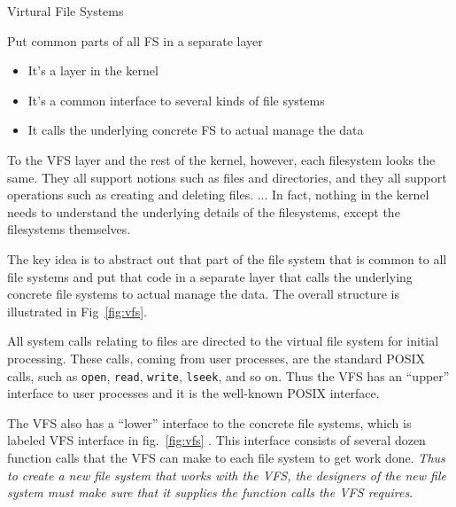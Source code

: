 \begin{frame}{Virtural File Systems}
  \begin{block}{Put common parts of all FS in a separate layer}
    \begin{itemize}
    \item It's a layer in the kernel
    \item It's a common interface to several kinds of file systems
    \item It calls the underlying concrete FS to actual manage the data
    \end{itemize}
  \end{block}
  \begin{center}\label{fig:vfs}
    \mode<beamer>{
      \texttt{[image: 04-18]}
    }
  \end{center}
\end{frame}

To the VFS layer and the rest of the kernel, however, each filesystem looks the same. They
all support notions such as files and directories, and they all support operations such as
creating and deleting files. ... In fact, nothing in the kernel needs to understand the
underlying details of the filesystems, except the filesystems
themselves.

The key idea is to abstract out that part of the file system that is common to all file
systems and put that code in a separate layer that calls the underlying concrete file
systems to actual manage the data. The overall structure is illustrated in
Fig~\ref{fig:vfs}.

All system calls relating to files are directed to the virtual file system for initial
processing. These calls, coming from user processes, are the standard POSIX calls, such as
\texttt{open}, \texttt{read}, \texttt{write}, \texttt{lseek}, and so on. Thus the VFS has
an ``upper'' interface to user processes and it is the well-known POSIX interface.

The VFS also has a ``lower'' interface to the concrete file systems, which is labeled VFS
interface in fig.~\ref{fig:vfs} . This interface consists of several dozen function calls
that the VFS can make to each file system to get work done. \emph{Thus to create a new
  file system that works with the VFS, the designers of the new file system must make sure
  that it supplies the function calls the VFS requires}.

